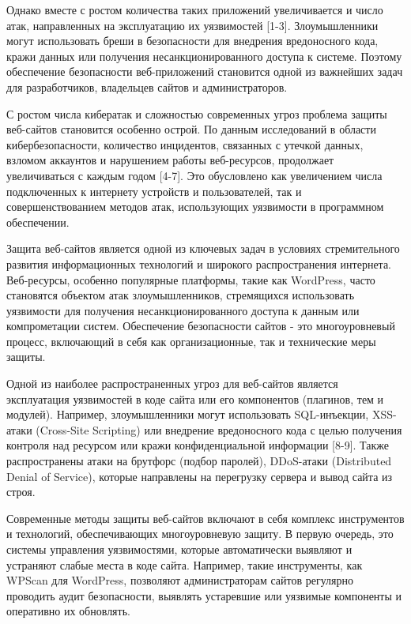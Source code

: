 Однако вместе с ростом количества таких приложений увеличивается и число
атак, направленных на эксплуатацию их уязвимостей {[}1-3{]}.
Злоумышленники могут использовать бреши в безопасности для внедрения
вредоносного кода, кражи данных или получения несанкционированного
доступа к системе. Поэтому обеспечение безопасности веб-приложений
становится одной из важнейших задач для разработчиков, владельцев сайтов
и администраторов.

С ростом числа кибератак и сложностью современных угроз проблема защиты
веб-сайтов становится особенно острой. По данным исследований в области
кибербезопасности, количество инцидентов, связанных с утечкой данных,
взломом аккаунтов и нарушением работы веб-ресурсов, продолжает
увеличиваться с каждым годом {[}4-7{]}. Это обусловлено как увеличением
числа подключенных к интернету устройств и пользователей, так и
совершенствованием методов атак, использующих уязвимости в программном
обеспечении.

Защита веб-сайтов является одной из ключевых задач в условиях
стремительного развития информационных технологий и широкого
распространения интернета. Веб-ресурсы, особенно популярные платформы,
такие как WordPress, часто становятся объектом атак злоумышленников,
стремящихся использовать уязвимости для получения несанкционированного
доступа к данным или компрометации систем. Обеспечение безопасности
сайтов - это многоуровневый процесс, включающий в себя как
организационные, так и технические меры защиты.

Одной из наиболее распространенных угроз для веб-сайтов является
эксплуатация уязвимостей в коде сайта или его компонентов (плагинов, тем
и модулей). Например, злоумышленники могут использовать SQL-инъекции,
XSS-атаки (Cross-Site Scripting) или внедрение вредоносного кода с целью
получения контроля над ресурсом или кражи конфиденциальной информации
{[}8-9{]}. Также распространены атаки на брутфорс (подбор паролей),
DDoS-атаки (Distributed Denial of Service), которые направлены на
перегрузку сервера и вывод сайта из строя.

Современные методы защиты веб-сайтов включают в себя комплекс
инструментов и технологий, обеспечивающих многоуровневую защиту. В
первую очередь, это системы управления уязвимостями, которые
автоматически выявляют и устраняют слабые места в коде сайта. Например,
такие инструменты, как WPScan для WordPress, позволяют администраторам
сайтов регулярно проводить аудит безопасности, выявлять устаревшие или
уязвимые компоненты и оперативно их обновлять.

